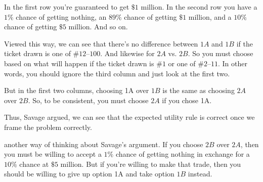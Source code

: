 \documentclass[justified]{tufte-book}
\theoremstyle{definition}
\theoremstyle{definition}
\theoremstyle{definition}
\theoremstyle{remark}
\begin{document}
In the first row you're guaranteed to get \(\$1\) million. In the second
row you have a \(1\%\) chance of getting nothing, an \(89\%\) chance of
getting \(\$1\) million, and a \(10\%\) chance of getting \(\$5\)
million. And so on.

Viewed this way, we can see that there's no difference between \(1A\)
and \(1B\) if the ticket drawn is one of \(\#12\)--\(100\). And likewise
for \(2A\) vs. \(2B\). So you must choose based on what will happen if
the ticket drawn is \(\#1\) or one of \(\#2\)--\(11\). In other words,
you should ignore the third column and just look at the first two.

But in the first two columns, choosing 1A over \(1B\) is the same as
choosing \(2A\) over \(2B\). So, to be consistent, you must choose
\(2A\) if you chose 1A.

Thus, Savage argued, we can see that the expected utility rule is
correct once we frame the problem correctly.

 another way of thinking about Savage's argument. If
you choose \(2B\) over \(2A\), then you must be willing to accept a
\(1\%\) chance of getting nothing in exchange for a \(10\%\) chance at
\(\$5\) million. But if you're willing to make that trade, then you
should be willing to give up option 1A and take option \(1B\) instead.
\end{document}
